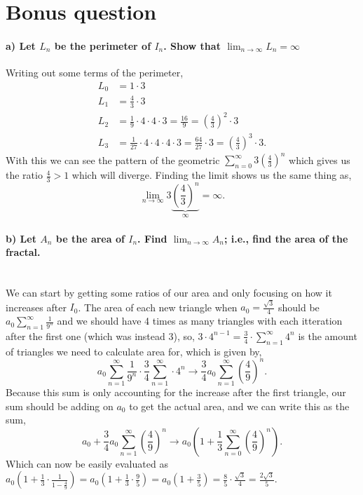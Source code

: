 \documentclass{report}
\begin{document}
\section*{Bonus question}%
\paragraph{a) Let $ L_n $ be the perimeter of $ I_n $. Show that $ \lim_{ n \to \infty} L_n = \infty$}
Writing out some terms of the perimeter, 
\begin{align*}
	L_0  &= 1\cdot 3 \\
	L_1 &= \frac{ 4 }{ 3 } \cdot 3 \\
	L_2 &= \frac{ 1 }{ 9 } \cdot 4\cdot 4\cdot 3=\frac{ 16 }{ 9 } =\left( \frac{ 4 }{ 3 }  \right) ^2 \cdot 3 \\
	L_3 &= \frac{ 1 }{ 27 } \cdot 4\cdot 4\cdot 4\cdot 3= \frac{ 64 }{ 27 } \cdot 3 = \left( \frac{ 4 }{ 3 }  \right) ^3\cdot 3
.\end{align*}
With this we can see the pattern of the geometric $ \sum_{ n=0 } ^{ \infty } 3\left( \frac{ 4 }{ 3 }  \right) ^{ n } $ which gives us the ratio $ \frac{ 4 }{ 3 } >1 $ which will diverge. Finding the limit shows us the same thing as,
\[
\lim_{ n \to \infty} 3 \underbrace{ \left( \frac{ 4 }{ 3 }  \right) ^{ n } }_{ \infty } = \infty
.\] 
\paragraph{b) Let $ A_n $ be the area of $ I_n $. Find $ \lim_{ n \to \infty} A_n  $; i.e., find the area of the fractal. \\ \\}
We can start by getting some ratios of our area and only focusing on how it increases after $ I_0 $. The area of each new triangle when $ a_0 = \frac{ \sqrt{ 3 }  }{ 4 } $ should be $ a_0 \sum_{ n=1 } ^{ \infty } \frac{1}{ 9^{ n } }  $ and we should have 4 times as many triangles with each itteration after the first one (which was instead 3), so, $ 3 \cdot 4^{ n-1 } = \frac{ 3 }{ 4 } \cdot \sum_{ n=1 } ^{ \infty } 4^{ n } $ is the amount of triangles we need to calculate area for, which is given by,
 \[
a_0\sum_{ n=1 } ^{ \infty }\frac{ 1 }{ 9^{ n } }\cdot \frac{ 3 }{ 4 } \sum_{ n=1 } ^{ \infty } \cdot 4^{ n } \to \frac{ 3 }{ 4 } a_0 \sum_{ n=1 } ^{ \infty } \left( \frac{ 4 }{ 9 }  \right)^{ n }
.\] 
Because this sum is only accounting for the increase after the first triangle, our sum should be adding on $ a_0 $ to get the actual area, and we can write this as the sum,
\[
	a_0 + \frac{ 3 }{ 4 } a_0 \sum_{ n=1 } ^{ \infty } \left( \frac{ 4 }{ 9 }  \right)^{ n } \to a_0\left(   1+\frac{ 1 }{ 3 } \sum_{ n=0 } ^{ \infty } \left( \frac{ 4 }{ 9 }  \right) ^{ n }\right)
.\] 
Which can now be easily evaluated as $ a_0\left( 1+\frac{ 1 }{ 3 } \cdot \frac{ 1 }{ 1-\frac{ 4 }{ 9 } } \right) = a_0\left( 1+\frac{ 1 }{ 3 } \cdot \frac{ 9 }{ 5 } \right) = a_0\left( 1+\frac{ 3 }{ 5 } \right) = \frac{ 8 }{ 5 } \cdot \frac{ \sqrt{ 3 }  }{ 4 } = \frac{ 2\sqrt{ 3 }  }{ 5 }$. 
\end{document}
